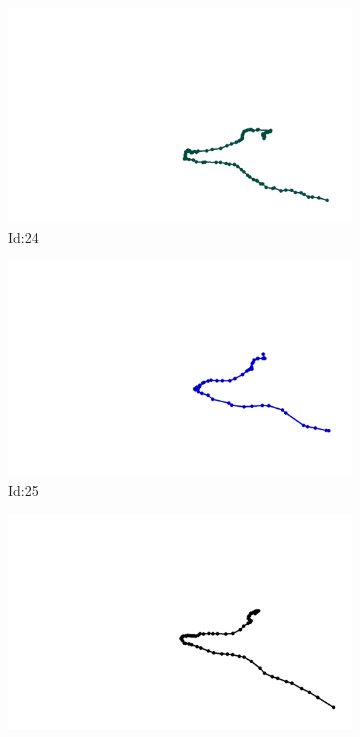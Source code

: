 \documentclass[12pt,twoside]{report}
\begin{document}
\begin{figure}
\centering
\begin{subfigure}[b]{0.20\textwidth}
\centering
\includegraphics[width=\textwidth]{../../trajectories/24.png}
\caption{Id:24}
\end{subfigure}
\begin{subfigure}[b]{0.20\textwidth}
\centering
\includegraphics[width=\textwidth]{../../trajectories/25.png}
\caption{Id:25}
\end{subfigure}
\begin{subfigure}[b]{0.20\textwidth}
\centering
\includegraphics[width=\textwidth]{../../trajectories/63.png}

\end{subfigure}
\end{figure}
\end{document}
